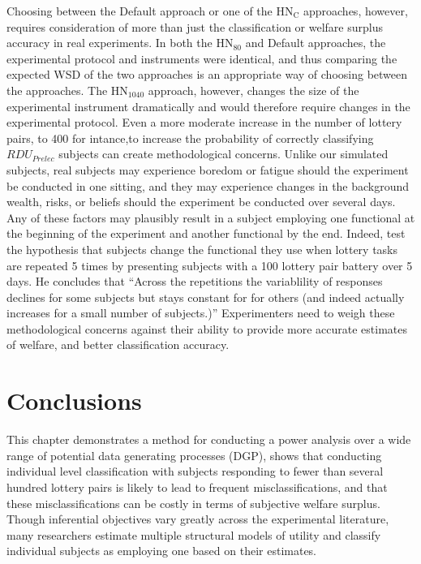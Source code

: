 \documentclass[../main.tex]{subfiles}
\begin{document}
\addtocounter{footnote}{-1}

Choosing between the Default approach or one of the $\text{HN}_\text{C}$ approaches, however, requires consideration of more than just the classification or welfare surplus accuracy in real experiments.
In both the $\text{HN}_{80}$ and Default approaches, the experimental protocol and instruments were identical, and thus comparing the expected WSD of the two approaches is an appropriate way of choosing between the approaches.
The $\text{HN}_{1040}$ approach, however, changes the size of the experimental instrument dramatically and would therefore require changes in the experimental protocol.
Even a more moderate increase in the number of lottery pairs, to 400 for intance,to increase the probability of correctly classifying $\mathit{RDU_{Prelec}}$ subjects can create methodological concerns.
Unlike our simulated subjects, real subjects may experience boredom or fatigue should the experiment be conducted in one sitting, and they may experience changes in the background wealth, risks, or beliefs should the experiment be conducted over several days.
Any of these factors may plausibly result in a subject employing one functional at the beginning of the experiment and another functional by the end.
Indeed, \textcite{Hey2001} test the hypothesis that subjects change the functional they use when lottery tasks are repeated 5 times by presenting subjects with a 100 lottery pair battery over 5 days.
He concludes that \enquote{Across the repetitions the variablility of responses declines for some subjects but stays constant for for others (and indeed actually increases for a small number of subjects.)}
Experimenters need to weigh these methodological concerns against their ability to provide more accurate estimates of welfare, and better classification accuracy.

\section{Conclusions}

This chapter demonstrates a method for conducting a power analysis over a wide range of potential data generating processes (DGP), shows that conducting individual level classification with subjects responding to fewer than several hundred lottery pairs is likely to lead to frequent misclassifications, and that these misclassifications can be costly in terms of subjective welfare surplus.
Though inferential objectives vary greatly across the experimental literature, many researchers estimate multiple structural models of utility and classify individual subjects as employing one based on their estimates.
\end{document}

